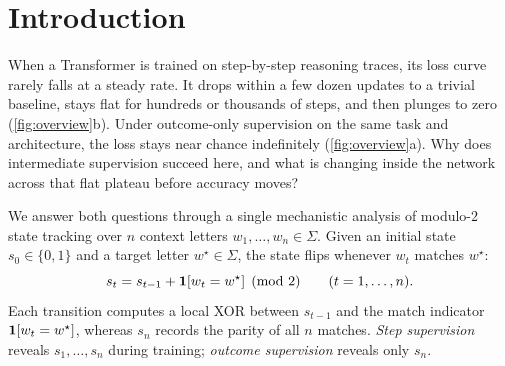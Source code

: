 \setcounter{dbltopnumber}{1}
\setcounter{topnumber}{1}

\begin{abstract}
Why does step-by-step supervision train Transformers on state tracking where outcome-only supervision stalls, even when a single two-block Transformer can express exact circuits for both? Studying modulo-$2$ counting, we show that unread state transitions damp outcome gradients exponentially in sequence length $n$, trapping full-model gradient flow near uniform predictions for $\Omega(\mixrate^{-n})$ time on one fixed rule ($\mixrate = |1-2p|$). Under step supervision, the linear readout quickly fits a state-only baseline at binary entropy $H(p)$. Rather than starving feature learning, this baseline cancels residual correlation with all $n-1$ wrong prefix letters while preserving signal from the target letter, allowing Block-$2$ attention to lock onto the true lookback lag while the loss stays flat (\emph{silent routing}). Blockwise RMS gradient normalization then removes a $\Theta(\initscale^{-5})$ query--key scale bottleneck without storing optimizer state, yielding polynomial-time rollout. Causal baseline-projection interventions and matched stateless Block-RMS runs in full Transformers verify each stage end-to-end.
\end{abstract}

\section{Introduction}
\label{sec:intro}

When a Transformer is trained on step-by-step reasoning traces, its loss curve rarely falls at a steady rate. It drops within a few dozen updates to a trivial baseline, stays flat for hundreds or thousands of steps, and then plunges to zero (\cref{fig:overview}b). Under outcome-only supervision on the same task and architecture, the loss stays near chance indefinitely (\cref{fig:overview}a). Why does intermediate supervision succeed here, and what is changing inside the network across that flat plateau before accuracy moves?

We answer both questions through a single mechanistic analysis of modulo-$2$ state tracking over $n$ context letters $w_1, \ldots, w_n \in \Sigma$. Given an initial state $s_0 \in \{0,1\}$ and a target letter $w^\star \in \Sigma$, the state flips whenever $w_t$ matches $w^\star$:
\[
  s_t = s_{t-1} + \mathbf 1[w_t = w^\star] \pmod 2 \qquad (t = 1, \ldots, n).
\]
Each transition computes a local XOR between $s_{t-1}$ and the match indicator $\mathbf 1[w_t = w^\star]$, whereas $s_n$ records the parity of all $n$ matches. \emph{Step supervision} reveals $s_1, \ldots, s_n$ during training; \emph{outcome supervision} reveals only $s_n$.

